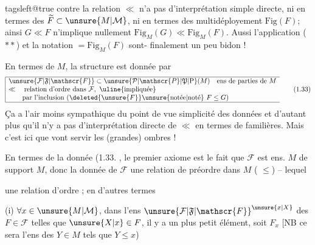 \begingroup
\csname tagsleft@true\endcsname
{}
 contre la relation $\ll$ n'a pas d'interprétation simple directe, ni en termes des  $\widetilde F\subset\unsure{M|\mathcal{M}}$, ni en termes des multidéployement $\mathrm{Fig}(F)$; ainsi $G\ll F$ n'implique nullement $\mathrm{Fig}_{M}(G)\ll\mathrm{Fig}_{M}(F)$. Aussi l'application ($**$) et la notation $=\mathrm{Fig}_{M}(F)$ sont- finalement un peu bidon !

En termes de $M$, la structure est donnée par
\[
\begin{array}{|l}\hline
\unsure{\mathcal{F}|\mathfrak{F}|\mathscr{F}}\subset\unsure{\mathcal{P}|\mathscr{P}|\mathfrak{P}|\mathrm{P}}(M)\quad\text{ens de parties de }M\\
\ll\quad\text{relation d'ordre dans }\mathcal{F},\ \text{\uline{impliquée}}\\
\qquad\text{par l'inclusion }(\deleted{\unsure{F}}\text{\unsure{notée|noté} }F\leq G)
\\\hline\end{array}
\tag*{(1.33)}
\]
Ça a l'air moins sympathique du point de vue simplicité des données et d'autant plus qu'il n'y a pas  d'interprétation directe de $\ll$ en termes de   familières. Mais c'est ici que vont servir les (grandes) ombres !

En termes de la  donnée (1.33.\unsure{)|]} , le  premier axiome est  le fait que $\mathcal{F}$ est  ens.   $M$ de   support $M$,  donc la donnée de  $\mathcal{F}$   une relation de préordre dans $M$ ( $\leq$) -- lequel 

une relation d'ordre ; en d'autres termes

(i) $\forall x\in\unsure{M|\mathcal{M}}$, dans l'ens ${\unsure{\mathcal{F}|\mathfrak{F}|\mathscr{F}}}^{\unsure{x|X}}$ des $F\in\mathcal{F}$ telles que $\unsure{X|x}\in F$, il y a un plus petit élément, soit $F_{x}$ [NB ce sera l'ens des $Y\in M$ tels que $Y\leq x$)

